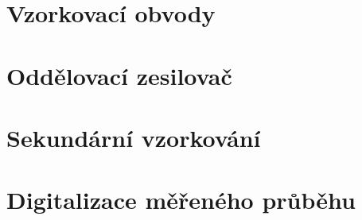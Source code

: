 \section{Vzorkovací obvody}

\section{Oddělovací zesilovač}

\section{Sekundární vzorkování}

\section{Digitalizace měřeného průběhu}